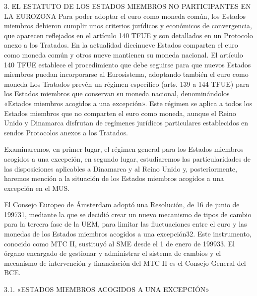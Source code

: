 \documentclass[10pt,a4paper]{article}
\newcounter{anexo}
\begin{document}
3. EL ESTATUTO DE LOS ESTADOS MIEMBROS NO PARTICIPANTES EN LA EUROZONA
Para poder adoptar el euro como moneda común, los Estados miembros debieron cumplir unos criterios jurídicos y económicos de convergencia, que aparecen reflejados en el artículo 140 TFUE y son detallados en un Protocolo anexo a los Tratados. En la actualidad diecinueve Estados comparten el euro como moneda común y otros nueve mantienen su moneda nacional. El artículo 140 TFUE establece el procedimiento que debe seguirse para que nuevos Estados miembros puedan incorporarse al Eurosistema, adoptando también el euro como moneda Los Tratados prevén un régimen específico (arts. 139 a 144 TFUE) para los Estados miembros que conservan su moneda nacional, denominándolos «Estados miembros acogidos a una  excepción». Este régimen se aplica a todos los Estados miembros que no comparten el euro como moneda, aunque el Reino Unido y Dinamarca disfrutan de regímenes jurídicos particulares establecidos en sendos Protocolos anexos a los Tratados.

Examinaremos, en primer lugar, el régimen general para los Estados miembros acogidos a una excepción, en segundo lugar, estudiaremos las particularidades de las disposiciones aplicables a Dinamarca y al Reino Unido y, posteriormente, haremos mención a la situación de los Estados miembros acogidos a una excepción en el MUS.

El Consejo Europeo de Ámsterdam adoptó una Resolución, de 16 de junio de 199731, mediante la que se decidió crear un nuevo mecanismo de tipos de cambio para la tercera fase de la UEM, para limitar las fluctuaciones entre el euro y las monedas de los Estados miembros acogidos a una excepción32. Este instrumento, conocido como MTC II, sustituyó al SME desde el 1 de enero de 199933. El órgano encargado de gestionar y administrar el sistema de cambios y el mecanismo de intervención y financiación del MTC II es el Consejo General del BCE.

3.1. «ESTADOS MIEMBROS ACOGIDOS A UNA EXCEPCIÓN»
\end{document}
